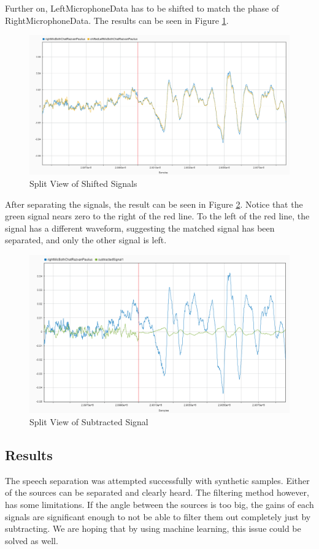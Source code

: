 Further on, LeftMicrophoneData has to be shifted to match the phase of RightMicrophoneData.
The results can be seen in Figure \ref{fig:SplitShifted}.
\begin{figure}[htp]
	\centering
	\includegraphics[width=.9\textwidth]{Illustrations/shiftedLeftAndRightSplitView.png}
	\caption{Split View of Shifted Signals}
	\label{fig:SplitShifted}
\end{figure}

After separating the signals, the result can be seen in Figure \ref{fig:SplitSeparated}.
Notice that the green signal nears zero to the right of the red line. To the left of the
red line, the signal has a different waveform, suggesting the matched signal has been
separated, and only the other signal is left.

\begin{figure}[htp]
	\centering
	\includegraphics[width=.9\textwidth]{Illustrations/rightAndSubtractedSplitView.png}
	\caption{Split View of Subtracted Signal}
	\label{fig:SplitSeparated}
\end{figure}




\newpage
\subsection*{Results} 
The speech separation was attempted successfully with synthetic samples. Either of 
the sources can be separated and clearly heard. The filtering method however, has 
some limitations. If the angle between the sources is too big, the gains of each 
signals are significant enough to not be able to filter them out completely just 
by subtracting. We are hoping that by using machine learning, this issue could be 
solved as well.

